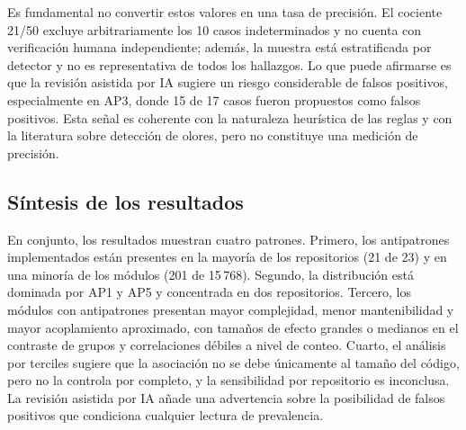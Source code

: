 Es fundamental no convertir estos valores en una tasa de precisión. El cociente 21/50 excluye arbitrariamente los 10 casos indeterminados y no cuenta con verificación humana independiente; además, la muestra está estratificada por detector y no es representativa de todos los hallazgos. Lo que puede afirmarse es que la revisión asistida por IA sugiere un riesgo considerable de falsos positivos, especialmente en AP3, donde 15 de 17 casos fueron propuestos como falsos positivos. Esta señal es coherente con la naturaleza heurística de las reglas y con la literatura sobre detección de olores, pero no constituye una medición de precisión.

\subsection{Síntesis de los resultados}

En conjunto, los resultados muestran cuatro patrones. Primero, los antipatrones implementados están presentes en la mayoría de los repositorios (21 de 23) y en una minoría de los módulos (201 de 15\,768). Segundo, la distribución está dominada por AP1 y AP5 y concentrada en dos repositorios. Tercero, los módulos con antipatrones presentan mayor complejidad, menor mantenibilidad y mayor acoplamiento aproximado, con tamaños de efecto grandes o medianos en el contraste de grupos y correlaciones débiles a nivel de conteo. Cuarto, el análisis por terciles sugiere que la asociación no se debe únicamente al tamaño del código, pero no la controla por completo, y la sensibilidad por repositorio es inconclusa. La revisión asistida por IA añade una advertencia sobre la posibilidad de falsos positivos que condiciona cualquier lectura de prevalencia.